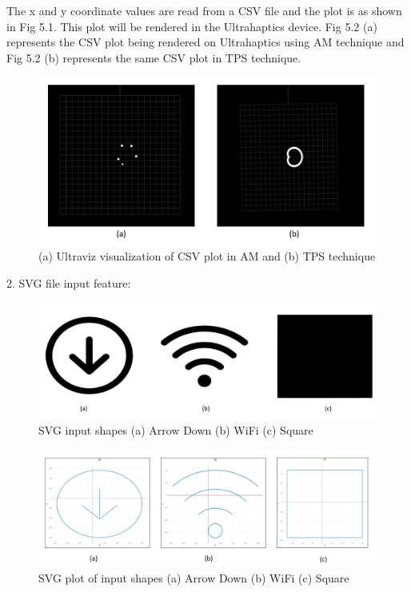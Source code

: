 The x and y coordinate values are read from a CSV file and the plot is as shown in Fig 5.1.
This plot will be rendered in the Ultrahaptics device. Fig 5.2 (a) represents the CSV plot being rendered on Ultrahaptics using AM technique and Fig 5.2 (b) represents the same CSV plot in TPS technique. 

\begin{figure}[htb]
	\includegraphics[width=\textwidth]{gfx/read_csv_rendering.png}
	\caption{(a) Ultraviz visualization of CSV plot in AM and (b) TPS technique}
	\label{fig:validation:csv_am}
\end{figure}

2. SVG file input feature:
\begin{figure}[htb]
	\includegraphics[width=\textwidth]{gfx/SVG Input.png}
	\caption{SVG input shapes (a) Arrow Down (b) WiFi (c) Square}
	\label{fig:validation:svg}
\end{figure}

\begin{figure}[htb]
	\includegraphics[width=\textwidth]{gfx/svg_plot.png}
	\caption{SVG plot of input shapes (a) Arrow Down (b) WiFi (c) Square}
	\label{fig:validation:svg_plot}
\end{figure}

